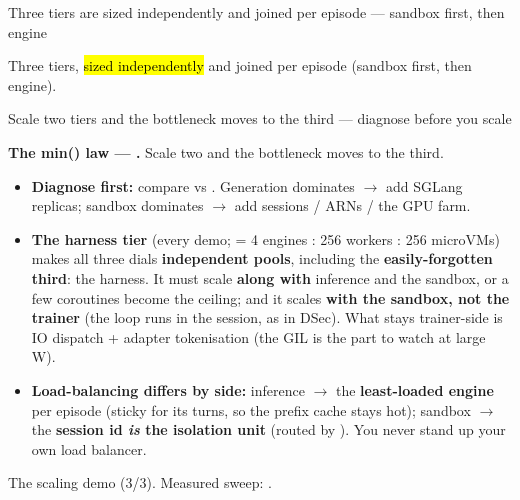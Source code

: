 \begin{frame}{Three tiers are sized independently and joined per episode --- sandbox first, then engine}
{}
\par\vspace{1mm}
\raggedright{\small Three tiers, \hl{sized independently} and joined per episode (sandbox first, then engine).\par}
\end{frame}

\begin{frame}{Scale two tiers and the bottleneck moves to the third --- diagnose before you scale}
{\small\textbf{The min() law --- \hl{}.} Scale two and the bottleneck moves to the third.\par}
\vspace{2mm}
\begin{itemize}\footnotesize\setlength{\itemsep}{2mm}
\item \textbf{Diagnose first:} compare  vs . Generation dominates $\rightarrow$ add SGLang replicas; sandbox dominates $\rightarrow$ add sessions / ARNs / the GPU farm.
\item \textbf{The harness tier} (every demo;  = 4 engines : 256 workers : 256 microVMs) makes all three dials \textbf{independent pools}, including the \textbf{easily-forgotten third}: the harness. It must scale \textbf{along with} inference and the sandbox, or a few coroutines become the ceiling; and it scales \textbf{with the sandbox, not the trainer} (the loop runs in the session, as in DSec). What stays trainer-side is IO dispatch + adapter tokenisation (the GIL is the part to watch at large W).
\item \textbf{Load-balancing differs by side:} inference $\rightarrow$ the \textbf{least-loaded engine} per episode (sticky for its turns, so the prefix cache stays hot); sandbox $\rightarrow$ the \textbf{session id \emph{is} the isolation unit} (routed by ). You never stand up your own load balancer.
\end{itemize}
\vspace{1mm}
{\scriptsize\color{inkmuted}The scaling demo (3/3). Measured sweep: .\par}
\end{frame}

